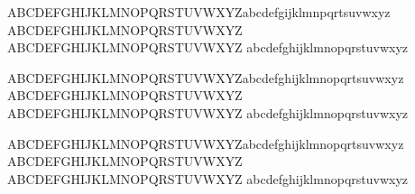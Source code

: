 \def\ddef#1{\expandafter\def\csname t#1\endcsname{\ensuremath{\tilde{#1}}}}
\ddefloop ABCDEFGHIJKLMNOPQRSTUVWXYZabcdefgijklmnpqrtsuvwxyz\ddefloop %
\def\ddef#1{\expandafter\def\csname tc#1\endcsname{\ensuremath{\tilde{\mathcal{#1}}}}}
\ddefloop ABCDEFGHIJKLMNOPQRSTUVWXYZ\ddefloop
\def\ddef#1{\expandafter\def\csname tb#1\endcsname{\ensuremath{\tilde{\mathbf{#1}}}}}
\ddefloop ABCDEFGHIJKLMNOPQRSTUVWXYZ\ddefloop
\def\ddef#1{\expandafter\def\csname tb#1\endcsname{\ensuremath{\tilde{\boldsymbol{#1}}}}}
\ddefloop abcdefghijklmnopqrstuvwxyz\ddefloop %

\def\ddef#1{\expandafter\def\csname bar#1\endcsname{\ensuremath{\bar{#1}}}}
\ddefloop ABCDEFGHIJKLMNOPQRSTUVWXYZabcdefghijklmnopqrtsuvwxyz\ddefloop
\def\ddef#1{\expandafter\def\csname barc#1\endcsname{\ensuremath{\bar{\mathcal{#1}}}}}
\ddefloop ABCDEFGHIJKLMNOPQRSTUVWXYZ\ddefloop
\def\ddef#1{\expandafter\def\csname barb#1\endcsname{\ensuremath{\bar{\mathbf{#1}}}}}
\ddefloop ABCDEFGHIJKLMNOPQRSTUVWXYZ\ddefloop
\def\ddef#1{\expandafter\def\csname barb#1\endcsname{\ensuremath{\bar{\boldsymbol{#1}}}}}
\ddefloop abcdefghijklmnopqrstuvwxyz\ddefloop %

\def\ddef#1{\expandafter\def\csname war#1\endcsname{\ensuremath{\overline{#1}}}}
\ddefloop ABCDEFGHIJKLMNOPQRSTUVWXYZabcdefghijklmnopqrtsuvwxyz\ddefloop
\def\ddef#1{\expandafter\def\csname warc#1\endcsname{\ensuremath{\overline{\mathcal{#1}}}}}
\ddefloop ABCDEFGHIJKLMNOPQRSTUVWXYZ\ddefloop
\def\ddef#1{\expandafter\def\csname warb#1\endcsname{\ensuremath{\overline{\mathbf{#1}}}}}
\ddefloop ABCDEFGHIJKLMNOPQRSTUVWXYZ\ddefloop
\def\ddef#1{\expandafter\def\csname warb#1\endcsname{\ensuremath{\overline{\boldsymbol{#1}}}}}
\ddefloop abcdefghijklmnopqrstuvwxyz\ddefloop %

\def\bff{{\boldsymbol f}}
\def\hbff{{\hat{\boldsymbol f}}}
\def\hatt{\hat{t}}
\def\tilo{{\tilde{o}}}
\def\tilh{{\tilde{h}}}
\def\bell{{{\boldsymbol\ell}}}
\def\tell{\ensuremath{\tilde{\ell}}} 
\def\btell{\ensuremath{\widetilde{\boldsymbol{\ell}}}} 
\def\hell{{{\hat\ell}}}

\def\rialpha{\ensuremath{{\mathring{\alpha}}}} 
\def\riz{\ensuremath{\mathring{z}}} 
\def\ribeta{\ensuremath{\mathring{\beta}}} 

